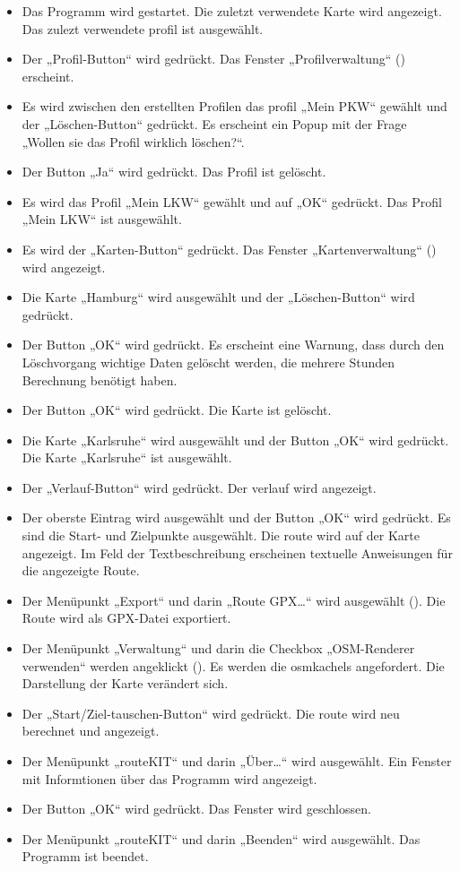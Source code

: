 \documentclass[a4paper, 11pt]{article}
\begin{document}
\begin{description}
\begin{itemize}
\item Das Programm \routeKIT wird gestartet. Die zuletzt verwendete Karte wird angezeigt. Das zulezt verwendete \gls{profil} ist ausgewählt. 
\item Der „Profil-Button“ wird gedrückt. Das Fenster „Profilverwaltung“  () erscheint.
\item Es wird zwischen den erstellten Profilen das \gls{profil} „Mein PKW“ gewählt und der „Löschen-Button“ gedrückt. Es erscheint ein Popup mit der Frage „Wollen sie das Profil wirklich löschen?“.
\item Der Button „Ja“ wird gedrückt. Das Profil ist gelöscht.
\item Es wird das Profil „Mein LKW“ gewählt und auf „OK“ gedrückt. Das Profil „Mein LKW“ ist ausgewählt. 
\item Es wird der „Karten-Button“ gedrückt. Das Fenster „Kartenverwaltung“ () wird angezeigt.
\item Die Karte „Hamburg“ wird ausgewählt und der „Löschen-Button“ wird gedrückt.
\item Der Button „OK“ wird gedrückt. Es erscheint eine Warnung, dass durch den Löschvorgang wichtige Daten gelöscht werden, die mehrere Stunden Berechnung benötigt haben.
\item Der Button „OK“ wird gedrückt. Die Karte ist gelöscht.
\item Die Karte „Karlsruhe“ wird ausgewählt  und der Button „OK“ wird gedrückt. Die Karte „Karlsruhe“ ist ausgewählt.
\item Der „Verlauf-Button“ wird gedrückt. Der \gls{verlauf} wird angezeigt.
\item Der oberste Eintrag wird ausgewählt und der Button „OK“ wird gedrückt. Es sind die Start- und Zielpunkte ausgewählt. Die \gls{route} wird auf der Karte angezeigt. Im Feld der Textbeschreibung erscheinen textuelle Anweisungen für die angezeigte Route.
\item Der Menüpunkt „Export“ und darin „Route GPX\ldots“ wird ausgewählt (). Die Route wird als GPX-Datei exportiert.
\item Der Menüpunkt „Verwaltung“ und darin die Checkbox „OSM-Renderer verwenden“ werden angeklickt (). Es werden die \glspl{osmkachel} angefordert. Die Darstellung der Karte verändert sich.
\item Der „Start/Ziel-tauschen-Button“ wird gedrückt. Die \gls{route} wird neu berechnet und angezeigt.
\item Der Menüpunkt „routeKIT“ und darin „Über\ldots“ wird ausgewählt. Ein Fenster mit Informtionen über das Programm wird angezeigt. 
\item Der Button „OK“ wird gedrückt. Das Fenster wird geschlossen.
\item Der Menüpunkt „routeKIT“ und darin „Beenden“ wird ausgewählt. Das Programm ist beendet.
\end{itemize}


\end{description}
\end{document}

